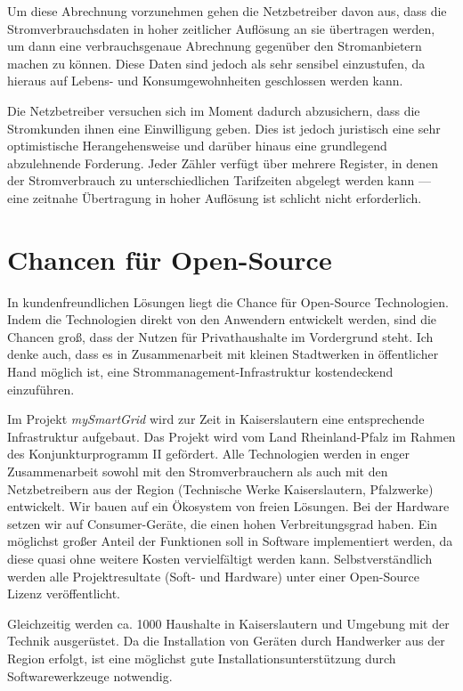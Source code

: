 \documentclass[12pt,BCOR=8.5mm]{scrartcl}
\begin{document}
Um diese Abrechnung vorzunehmen gehen die Netzbetreiber davon aus, dass
die Stromverbrauchsdaten in hoher zeitlicher Auflösung an sie
übertragen werden, um dann eine verbrauchsgenaue Abrechnung gegenüber
den Stromanbietern machen zu können.
Diese Daten sind jedoch als sehr sensibel einzustufen, da hieraus auf
Lebens- und Konsumgewohnheiten geschlossen werden kann.

Die Netzbetreiber versuchen sich im Moment dadurch abzusichern, dass die
Stromkunden ihnen eine Einwilligung geben. Dies ist jedoch juristisch
eine sehr optimistische Herangehensweise  und darüber hinaus eine grundlegend abzulehnende Forderung.
Jeder Zähler verfügt über mehrere Register, in denen der Stromverbrauch
zu unterschiedlichen Tarifzeiten abgelegt werden kann --- eine zeitnahe
Übertragung in hoher Auflösung ist schlicht nicht erforderlich.

\section{Chancen für Open-Source}\label{sec:chancen_open-source}
In kundenfreundlichen Lösungen liegt die Chance für Open-Source
Technologien. Indem die Technologien direkt von den Anwendern entwickelt
werden, sind die Chancen groß, dass der Nutzen für Privathaushalte im
Vordergrund steht.  Ich denke auch, dass es in Zusammenarbeit mit
kleinen Stadtwerken in öffentlicher Hand möglich ist, eine
Strommanagement-Infrastruktur kostendeckend einzuführen.

Im Projekt \emph{mySmartGrid} wird zur Zeit in Kaiserslautern eine
entsprechende Infrastruktur aufgebaut. Das Projekt wird vom Land
Rheinland-Pfalz im Rahmen des Konjunkturprogramm II gefördert. Alle
Technologien werden in enger Zusammenarbeit sowohl mit den
Stromverbrauchern als auch mit den Netzbetreibern aus der Region
(Technische Werke Kaiserslautern, Pfalzwerke) entwickelt.  Wir bauen auf
ein Ökosystem von freien Lösungen.  Bei der Hardware setzen wir auf
Consumer-Geräte, die einen hohen Verbreitungsgrad haben.  Ein möglichst
großer Anteil der Funktionen soll in Software implementiert werden, da
diese quasi ohne weitere Kosten vervielfältigt werden kann.
Selbstverständlich werden alle Projektresultate (Soft- und Hardware)
unter einer Open-Source Lizenz veröffentlicht. 

Gleichzeitig werden ca.  1000 Haushalte in Kaiserslautern und Umgebung
mit der Technik ausgerüstet. Da die Installation von Geräten durch
Handwerker aus der Region erfolgt, ist eine möglichst gute
Installationsunterstützung durch Softwarewerkzeuge notwendig.
\end{document}
